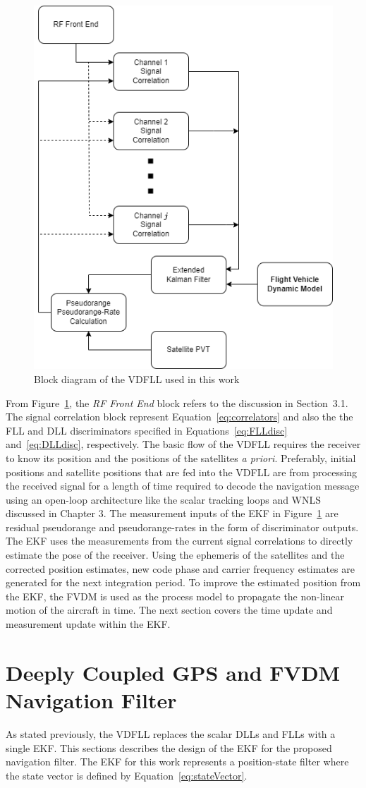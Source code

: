 \begin{figure}[!ht]
    \centering
    \includegraphics[width=0.45\linewidth]{Figures/VectorTracking.drawio.png}
    \caption{Block diagram of the VDFLL used in this work}\label{fig:VDFLL}
\end{figure}

From Figure~\ref{fig:VDFLL}, the \textit{RF Front End} block refers to the discussion in Section~3.1. The signal correlation block represent Equation~\ref{eq:correlators} and also the the FLL and DLL discriminators specified in Equations~\ref{eq:FLLdisc} and~\ref{eq:DLLdisc}, respectively. The basic flow of the VDFLL requires the receiver to know its position and the positions of the satellites \textit{a priori}. Preferably, initial positions and satellite positions that are fed into the VDFLL are from processing the received signal for a length of time required to decode the navigation message using an open-loop architecture like the scalar tracking loops and WNLS discussed in Chapter 3. The measurement inputs of the EKF in Figure~\ref{fig:VDFLL} are residual pseudorange and pseudorange-rates in the form of discriminator outputs. The EKF uses the measurements from the current signal correlations to directly estimate the pose of the receiver. Using the ephemeris of the satellites and the corrected position estimates, new code phase and carrier frequency estimates are generated for the next integration period. To improve the estimated position from the EKF, the FVDM is used as the process model to propagate the non-linear motion of the aircraft in time. The next section covers the time update and measurement update within the EKF\@.

\section{\textbf{Deeply Coupled GPS and FVDM Navigation Filter}}
As stated previously, the VDFLL replaces the scalar DLLs and FLLs with a single EKF\@. This sections describes the design of the EKF for the proposed navigation filter. The EKF for this work represents a position-state filter where the state vector is defined by Equation~\ref{eq:stateVector}.


